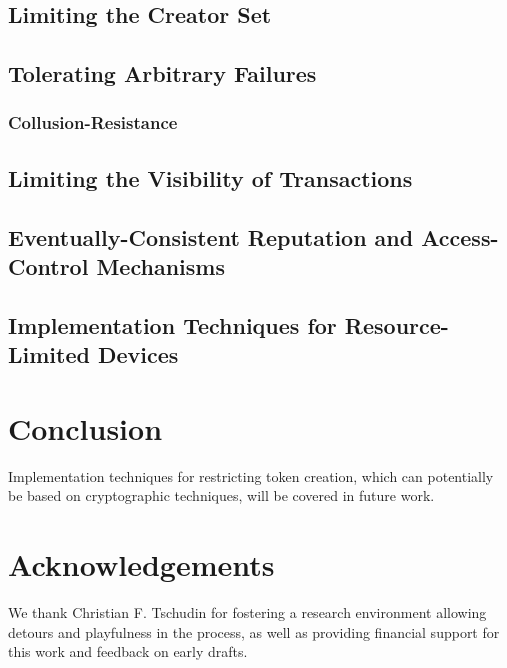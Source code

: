 \documentclass[9pt, oneside]{article}   	%
\begin{document}
\subsection{Limiting the Creator Set}

\subsection{Tolerating Arbitrary Failures}

	\subsubsection{Collusion-Resistance}

\subsection{Limiting the Visibility of Transactions}

\subsection{Eventually-Consistent Reputation and Access-Control Mechanisms}

\subsection{Implementation Techniques for Resource-Limited Devices}

\section{Conclusion}
\label{sec:conclusion}

Implementation techniques for restricting token creation, which can potentially be based on cryptographic techniques, will be covered in future work.

\section{Acknowledgements}
\label{sec:acknowledgements}

We thank Christian F. Tschudin for fostering a research environment allowing detours and playfulness in the process, as well as providing financial support for this work and feedback on early drafts. 

\newpage




\newpage
\appendix
\end{document}
